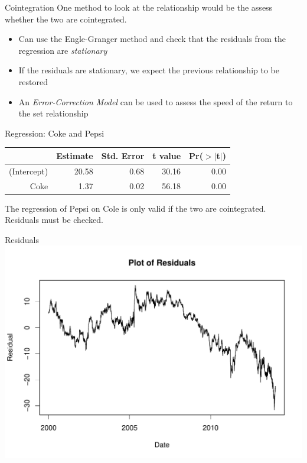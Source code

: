 \documentclass[14pt,xcolor=pdftex,dvipsnames,table]{beamer}\usepackage[]{graphicx}\usepackage[]{color}
\makeatletter
\def\maxwidth{ %
  \ifdim\Gin@nat@width>\linewidth
    \linewidth
  \else
    \Gin@nat@width
  \fi
}
\newenvironment{knitrout}{}{} %
\makeatother
\begin{document}
\begin{frame}{Cointegration}
One method to look at the relationship would be the assess whether the two are cointegrated.
\begin{itemize}[<+-| alert@+>]
\item Can use the Engle-Granger method and check that the residuals from the regression are \emph{stationary}
\item If the residuals are stationary, we expect the previous relationship to be restored
\item An \emph{Error-Correction Model} can be used to assess the speed of the return to the set relationship
\end{itemize}
\end{frame}
\begin{frame}{Regression: Coke and Pepsi}
\begin{table}[ht]
\centering
\begin{tabular}{rrrrr}
  \hline
 & Estimate & Std. Error & t value & Pr($>$$|$t$|$) \\ 
  \hline
(Intercept) & 20.58 & 0.68 & 30.16 & 0.00 \\ 
  Coke & 1.37 & 0.02 & 56.18 & 0.00 \\ 
   \hline
\end{tabular}
\end{table}

The regression of Pepsi on Cole is only valid if the two are cointegrated.  Residuals must be checked. 

\end{frame}

\begin{frame}{Residuals}
\begin{knitrout}
\color{fgcolor}
\includegraphics[width=\maxwidth]{figure/Resid} 

\end{knitrout}

\end{frame}
\end{document}
